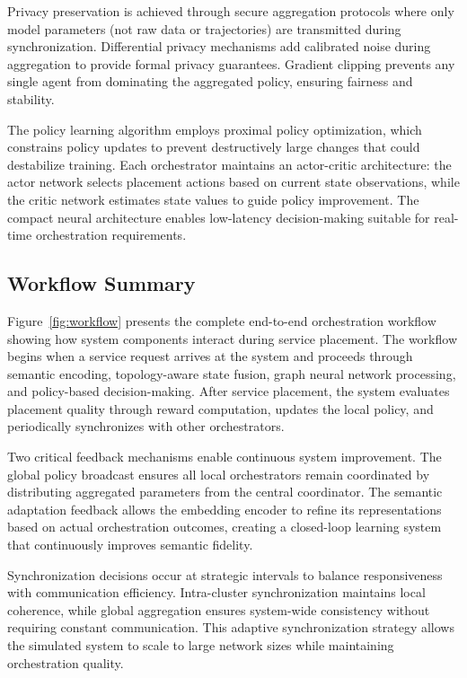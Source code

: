 \documentclass[conference]{IEEEtran}
\begin{document}
	Privacy preservation is achieved through secure aggregation protocols where only model parameters (not raw data or trajectories) are transmitted during synchronization. Differential privacy mechanisms add calibrated noise during aggregation to provide formal privacy guarantees. Gradient clipping prevents any single agent from dominating the aggregated policy, ensuring fairness and stability.
	
	The policy learning algorithm employs proximal policy optimization, which constrains policy updates to prevent destructively large changes that could destabilize training. Each orchestrator maintains an actor-critic architecture: the actor network selects placement actions based on current state observations, while the critic network estimates state values to guide policy improvement. The compact neural architecture enables low-latency decision-making suitable for real-time orchestration requirements.
	
	\subsection{Workflow Summary}
	\label{subsec:workflow}
	
	Figure~\ref{fig:workflow} presents the complete end-to-end orchestration workflow showing how system components interact during service placement. The workflow begins when a service request arrives at the system and proceeds through semantic encoding, topology-aware state fusion, graph neural network processing, and policy-based decision-making. After service placement, the system evaluates placement quality through reward computation, updates the local policy, and periodically synchronizes with other orchestrators.
	
	Two critical feedback mechanisms enable continuous system improvement. The global policy broadcast ensures all local orchestrators remain coordinated by distributing aggregated parameters from the central coordinator. The semantic adaptation feedback allows the embedding encoder to refine its representations based on actual orchestration outcomes, creating a closed-loop learning system that continuously improves semantic fidelity.
	
	Synchronization decisions occur at strategic intervals to balance responsiveness with communication efficiency. Intra-cluster synchronization maintains local coherence, while global aggregation ensures system-wide consistency without requiring constant communication. This adaptive synchronization strategy allows the simulated system to scale to large network sizes while maintaining orchestration quality.
	
\end{document}
